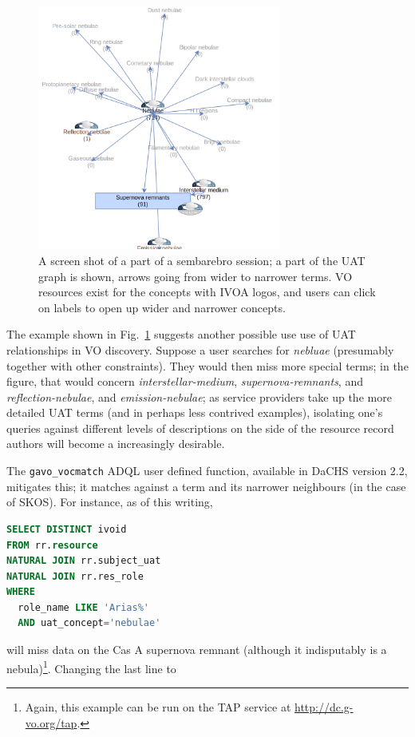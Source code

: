 \documentclass[11pt,a4paper]{ivoa}
\newcommand{\vocterm}[1]{\emph{\color{termcolor}#1}}
\begin{document}
\begin{figure}
\includegraphics[width=8cm]{sembarebro.png}
\caption{A screen shot of a part of a sembarebro session; a part of the
UAT graph is shown, arrows going from wider to narrower terms.  VO
resources exist for the concepts with IVOA logos, and users can click on
labels to open up wider and narrower concepts.}
\label{fig:sembarebro}
\end{figure}

The example shown in Fig.~\ref{fig:sembarebro} suggests another possible use
use of UAT relationships in VO discovery.  Suppose a user searches 
for \vocterm{nebluae} (presumably together with other constraints).
They would then miss more special terms; in the figure, that would
concern \vocterm{interstellar-medium}, \vocterm{supernova-remnants}, and
\vocterm{reflection-nebulae}, and \vocterm{emission-nebulae}; as service
providers take up the more detailed UAT terms (and in perhaps less
contrived examples), isolating one's queries against different levels
of descriptions on the side of the resource record authors will become a
increasingly desirable.

The \verb|gavo_vocmatch| ADQL user defined function, available in DaCHS
version 2.2, mitigates this; it matches against a term and its narrower
neighbours (in the case of SKOS).  For instance, as of this writing,
\begin{lstlisting}[language=SQL]
SELECT DISTINCT ivoid 
FROM rr.resource
NATURAL JOIN rr.subject_uat
NATURAL JOIN rr.res_role
WHERE
  role_name LIKE 'Arias%'
  AND uat_concept='nebulae'
\end{lstlisting}
will miss data on the Cas A supernova remnant (although it indisputably
is a nebula)\footnote{Again, this example can be run on the TAP service
at \url{http://dc.g-vo.org/tap}.}.  Changing the last line to
\end{document}
